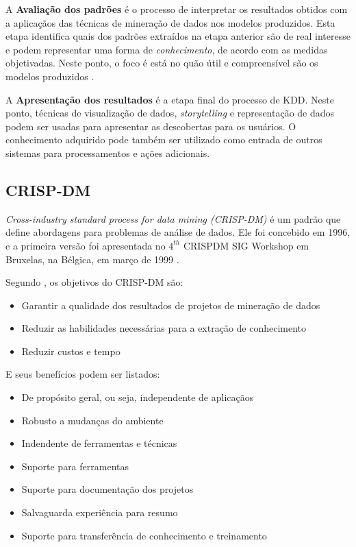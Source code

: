 \documentclass[
	article,			%
	11pt,				%
	oneside,			%
	a4paper,			%
	english,			%
	brazil,				%
	sumario=tradicional
	]{abntex2}
\begin{document}
A \textbf{Avaliação dos padrões} é o processo de interpretar os resultados
obtidos com a aplicaçãos das técnicas de mineração de dados nos modelos
produzidos. Esta etapa identifica quais dos padrões extraídos na etapa anterior
são de real interesse e podem representar uma forma de \textit{conhecimento},
de acordo com as medidas objetivadas. Neste ponto, o foco é está no quão útil e
compreensível são os modelos produzidos \cite{chehab2020}.

A \textbf{Apresentação dos resultados} é a etapa final do processo de KDD. Neste
ponto, técnicas de visualização de dados, \textit{storytelling} e representação
de dados podem ser usadas para apresentar as descobertas para os usuários. O
conhecimento adquirido pode também ser utilizado como entrada de outros sistemas
para processamentos e ações adicionais.

\subsection{CRISP-DM}

\textit{Cross-industry standard process for data mining (CRISP-DM)} é um padrão
que define abordagens para problemas de análise de dados. Ele foi concebido em
1996, e a primeira versão foi apresentada no $4^{th}$ CRISPDM SIG Workshop em
Bruxelas, na Bélgica, em março de 1999 \cite{wikipedia-crisp-2021}.

Segundo , os objetivos do CRISP-DM são:

\begin{itemize}
  \item Garantir a qualidade dos resultados de projetos de mineração de dados
  \item Reduzir as habilidades necessárias para a extração de conhecimento
  \item Reduzir custos e tempo
\end{itemize}

E seus benefícios podem ser listados:

\begin{itemize}
  \item De propósito geral, ou seja, independente de aplicaçãos
  \item Robusto a mudanças do ambiente
  \item Indendente de ferramentas e técnicas
  \item Suporte para ferramentas
  \item Suporte para documentação dos projetos
  \item Salvaguarda experiência para resumo
  \item Suporte para transferência de conhecimento e treinamento
\end{itemize}
\end{document}

